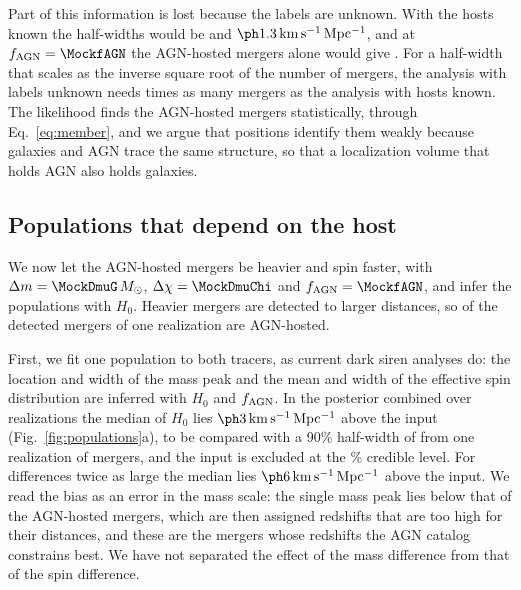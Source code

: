 \documentclass[aps,prd,reprint,amsmath,amssymb,nofootinbib]{revtex4-2}
\newcommand{\kmsMpc}{\,{\rm km\,s^{-1}\,Mpc^{-1}}}
\newcommand{\Msun}{\,M_\odot}
\newcommand{\fAGN}{f_{\rm AGN}}
\begin{document}
Part of this information is lost because the labels are unknown.
With the hosts known the half-widths would be \IndHWKnownTenth{} and $\IndHWKnown\kmsMpc$, and at $\fAGN=\MockfAGN$ the AGN-hosted mergers alone would give \IndHWKnownAGNPart. %
For a half-width that scales as the inverse square root of the number of mergers, the analysis with labels unknown needs \IndCostMix{} times as many mergers as the analysis with hosts known. %
The likelihood finds the AGN-hosted mergers statistically, through Eq.~\eqref{eq:member}, and we argue that positions identify them weakly because galaxies and AGN trace the same structure, so that a localization volume that holds AGN also holds galaxies. %

\subsection{Populations that depend on the host}
\label{sec:populations}

We now let the AGN-hosted mergers be heavier and spin faster, with $\Delta m=\MockDmuG\Msun$, $\Delta\chi=\MockDmuChi$ and $\fAGN=\MockfAGN$, and infer the populations with $H_0$.
Heavier mergers are detected to larger distances, so \IndConceptNAGNHosted{} of the \MockNev{} detected mergers of one realization are AGN-hosted.

First, we fit one population to both tracers, as current dark siren analyses do: the location and width of the mass peak and the mean and width of the effective spin distribution are inferred with $H_0$ and $\fAGN$.
In the posterior combined over \NrealHDSingle{} realizations the median of $H_0$ lies $\IndBias\kmsMpc$ above the input (Fig.~\ref{fig:populations}a), to be compared with a 90\% half-width of \IndHWOnePop{} from one realization of \MockNev{} mergers, and the input is excluded at the \IndOnePopCL\% credible level. %
For differences twice as large the median lies $\IndBiasTwice\kmsMpc$ above the input. %
We read the bias as an error in the mass scale: the single mass peak lies below that of the AGN-hosted mergers, which are then assigned redshifts that are too high for their distances, and these are the mergers whose redshifts the AGN catalog constrains best. %
We have not separated the effect of the mass difference from that of the spin difference.
\end{document}
